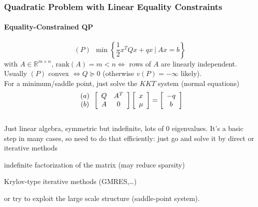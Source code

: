 \documentclass[10pt]{report}
\begin{document}
\subsubsection{Quadratic Problem with Linear Equality Constraints}
\paragraph{Equality-Constrained QP} $$(P)\:\:\min\left\{\frac{1}{2}x^TQx+qx\:|\:Ax=b\right\}$$ with $A\in \mathbb{R}^{m\times n}$, $\text{rank}(A)=m<n \Leftrightarrow$ rows of $A$ are linearly independent. Usually $(P)$ convex $\Leftrightarrow Q\succeq 0$ (otherwise $v(P)=-\infty$ likely).\\
For a minimum/saddle point, just solve the $KKT$ system (normal equations)
$$\begin{array}{c}
(a)\\(b)
\end{array}\left[\begin{array}{c c}
Q&A^T\\A&0
\end{array}\right]\left[\begin{array}{c}
x\\\mu
\end{array}\right]=\left[\begin{array}{c}
-q\\b
\end{array}\right]$$\\
Just linear algebra, symmetric but indefinite, lots of 0 eigenvalues. It's a basic step in many cases, so need to do that efficiently: just go and solve it by direct or iterative methods
\begin{list}{}{}
	\item indefinite factorization of the matrix (may reduce sparsity)
	\item Krylov-type iterative methods (GMRES,\ldots)
\end{list}
or try to exploit the large scale structure (saddle-point system).
\end{document}
